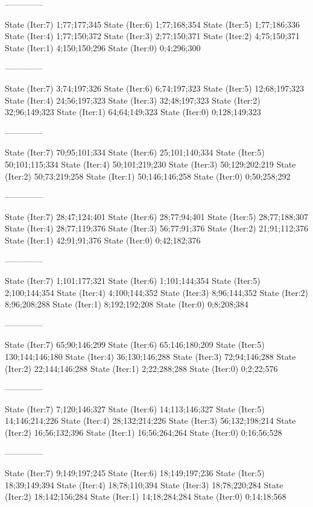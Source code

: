 \documentclass[a4paper,10pt,ngerman]{scrartcl}
\begin{document}
\begin{lstcs}
--------------

State (Iter:7) {1;77;177;345}
State (Iter:6) {1;77;168;354}
State (Iter:5) {1;77;186;336}
State (Iter:4) {1;77;150;372}
State (Iter:3) {2;77;150;371}
State (Iter:2) {4;75;150;371}
State (Iter:1) {4;150;150;296}
State (Iter:0) {0;4;296;300}

--------------

State (Iter:7) {3;74;197;326}
State (Iter:6) {6;74;197;323}
State (Iter:5) {12;68;197;323}
State (Iter:4) {24;56;197;323}
State (Iter:3) {32;48;197;323}
State (Iter:2) {32;96;149;323}
State (Iter:1) {64;64;149;323}
State (Iter:0) {0;128;149;323}

--------------

State (Iter:7) {70;95;101;334}
State (Iter:6) {25;101;140;334}
State (Iter:5) {50;101;115;334}
State (Iter:4) {50;101;219;230}
State (Iter:3) {50;129;202;219}
State (Iter:2) {50;73;219;258}
State (Iter:1) {50;146;146;258}
State (Iter:0) {0;50;258;292}

--------------

State (Iter:7) {28;47;124;401}
State (Iter:6) {28;77;94;401}
State (Iter:5) {28;77;188;307}
State (Iter:4) {28;77;119;376}
State (Iter:3) {56;77;91;376}
State (Iter:2) {21;91;112;376}
State (Iter:1) {42;91;91;376}
State (Iter:0) {0;42;182;376}

--------------

State (Iter:7) {1;101;177;321}
State (Iter:6) {1;101;144;354}
State (Iter:5) {2;100;144;354}
State (Iter:4) {4;100;144;352}
State (Iter:3) {8;96;144;352}
State (Iter:2) {8;96;208;288}
State (Iter:1) {8;192;192;208}
State (Iter:0) {0;8;208;384}

--------------

State (Iter:7) {65;90;146;299}
State (Iter:6) {65;146;180;209}
State (Iter:5) {130;144;146;180}
State (Iter:4) {36;130;146;288}
State (Iter:3) {72;94;146;288}
State (Iter:2) {22;144;146;288}
State (Iter:1) {2;22;288;288}
State (Iter:0) {0;2;22;576}

--------------

State (Iter:7) {7;120;146;327}
State (Iter:6) {14;113;146;327}
State (Iter:5) {14;146;214;226}
State (Iter:4) {28;132;214;226}
State (Iter:3) {56;132;198;214}
State (Iter:2) {16;56;132;396}
State (Iter:1) {16;56;264;264}
State (Iter:0) {0;16;56;528}

--------------

State (Iter:7) {9;149;197;245}
State (Iter:6) {18;149;197;236}
State (Iter:5) {18;39;149;394}
State (Iter:4) {18;78;110;394}
State (Iter:3) {18;78;220;284}
State (Iter:2) {18;142;156;284}
State (Iter:1) {14;18;284;284}
State (Iter:0) {0;14;18;568}


\end{lstcs}
\end{document}
